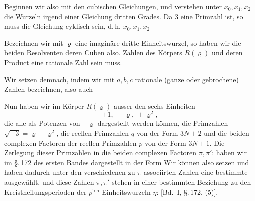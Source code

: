 Beginnen wir also mit den cubischen Gleichungen, und verstehen
 unter $x_0, x_1, x_2$ die Wurzeln irgend einer 
Gleichung dritten Grades. Da 3 eine Primzahl ist, so muss die
Gleichung cyklisch sein, d.\,h.  $x_0, x_1, x_2$ 

Bezeichnen wir mit $\varrho$ eine imaginäre dritte Einheitswurzel,
so haben wir die beiden Resolventen
deren Cuben also. Zahlen des Körpers $R(\varrho)$ und deren Product %
eine rationale Zahl sein muss.

Wir setzen demnach, indem wir mit $a, b, c$ rationale (ganze
oder gebrochene) Zahlen bezeichnen,
also auch

Nun haben wir im Körper $R(\varrho)$ ausser den sechs Einheiten
\[ \pm 1,\ \pm\varrho,\ \pm\varrho^2, \]
die alle als Potenzen von $-\varrho$ dargestellt werden können, die
Primzahlen $\sqrt{-3} = \varrho - \varrho^2$, die reellen Primzahlen $q$ von der
Form $3N+2$ und die beiden complexen Factoren der reellen
Primzahlen $p$ von der Form $3N+1$. Die Zerlegung dieser
Primzahlen in die beiden complexen Factoren $\pi, \pi'$:
haben wir im \S.\,172 des ersten Bandes dargestellt in der Form
Wir können also
setzen und haben dadurch unter den verschiedenen zu $\pi$ associirten
 Zahlen eine bestimmte ausgewählt, und diese Zahlen
$\pi, \pi'$ stehen in einer bestimmten Beziehung zu den Kreis\-theilungsperioden
 der $p^{\text{ten}}$ Einheitswurzeln $\eta$:
[Bd.\ I, \S.\,172, (5)].

